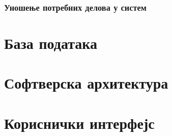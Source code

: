 \documentclass{article}
\begin{document}
\subsubsection{Уношење потребних делова у систем}

\section{База података}

\section{Софтверска архитектура}

\section{Кориснички интерфејс}

\newpage

 
\end{document}
